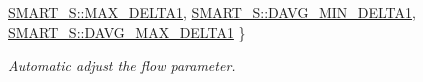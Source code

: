 \begin{DoxyCompactItemize}
\mbox{\hyperlink{classforte_1_1_m_r_d_s_r_g_ae11de126949a51f3c7f7978e3802cf1aacac61ebde203ec61fa196b4d28cc326f}{S\+M\+A\+R\+T\+\_\+\+S\+::\+M\+A\+X\+\_\+\+D\+E\+L\+T\+A1}}, 
\mbox{\hyperlink{classforte_1_1_m_r_d_s_r_g_ae11de126949a51f3c7f7978e3802cf1aa474437f916a2f1e6a65df0b30c7ba2fe}{S\+M\+A\+R\+T\+\_\+\+S\+::\+D\+A\+V\+G\+\_\+\+M\+I\+N\+\_\+\+D\+E\+L\+T\+A1}}, 
\newline
\mbox{\hyperlink{classforte_1_1_m_r_d_s_r_g_ae11de126949a51f3c7f7978e3802cf1aa2c412ab776614964ecaef4b1aaa8f71f}{S\+M\+A\+R\+T\+\_\+\+S\+::\+D\+A\+V\+G\+\_\+\+M\+A\+X\+\_\+\+D\+E\+L\+T\+A1}}
 \}
\begin{DoxyCompactList}\small\item\em Automatic adjust the flow parameter. \end{DoxyCompactList}\end{DoxyCompactItemize}
